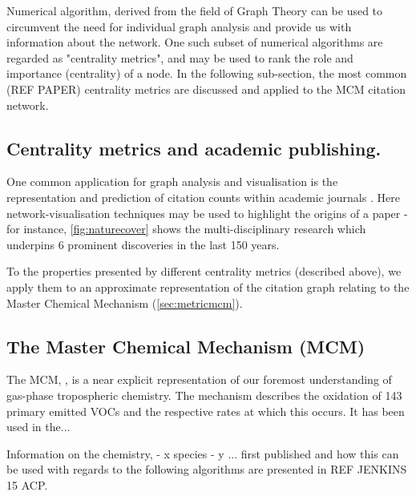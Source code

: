 Numerical algorithm, derived from the field of Graph Theory can be used to circumvent the need for individual graph analysis and provide us with information about the network. One such subset of numerical algorithms are regarded as "centrality metrics", and may be used to rank the role and importance (centrality) of a node. In the following sub-section, the most common (REF PAPER) centrality metrics are discussed and applied to the MCM citation network. 


\subsection{Centrality metrics and academic publishing.}


One common application for graph analysis and visualisation is the representation and prediction of citation counts within academic journals \citep{cocite,google,naturecitation,netcoauthor}. Here network-visualisation techniques may be used to highlight the origins of a paper - for instance, \autoref{fig:naturecover} shows the multi-disciplinary research which underpins 6 prominent discoveries in the last 150 years. 

To the properties presented by different centrality metrics (described above), we apply them to an approximate representation of the citation graph relating to the Master Chemical Mechanism (\autoref{sec:metricmcm}).



\subsection{The Master Chemical Mechanism (MCM)}\label{sec:metricmcm}

The MCM, \citep{mcm}, is a near explicit representation of our foremost understanding of gas-phase tropospheric chemistry. The mechanism describes the oxidation of 143 primary emitted VOCs and the respective rates at which this occurs. It has been used in the... 



 Information on the chemistry, - x species - y ... first published and how this can be used with regards to the following algorithms are presented in REF JENKINS 15 ACP. 


